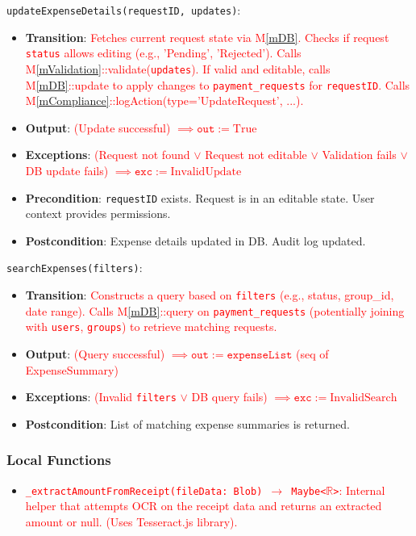 \documentclass[12pt, titlepage]{article}
\providecommand{\mref}[1]{M\ref{#1}}
\begin{document}
\noindent \texttt{updateExpenseDetails(requestID, updates)}:
\begin{itemize}
    \item \textbf{Transition}: \textcolor{red}{Fetches current request state via \mref{mDB}. Checks if request \texttt{status} allows editing (e.g., 'Pending', 'Rejected'). Calls \mref{mValidation}::validate(\texttt{updates}). If valid and editable, calls \mref{mDB}::update to apply changes to \texttt{payment\_requests} for \texttt{requestID}. Calls \mref{mCompliance}::logAction(type='UpdateRequest', ...).}
    \item \textbf{Output}: \textcolor{red}{(Update successful) $\implies \texttt{out} := \text{True}$}
    \item \textbf{Exceptions}: \textcolor{red}{(Request not found $\lor$ Request not editable $\lor$ Validation fails $\lor$ DB update fails) $\implies \texttt{exc} := \text{InvalidUpdate}$}
    \item \textbf{Precondition}: \texttt{requestID} exists. Request is in an editable state. User context provides permissions.
    \item \textbf{Postcondition}: Expense details updated in DB. Audit log updated.
\end{itemize}

\noindent \texttt{searchExpenses(filters)}:
\begin{itemize}
    \item \textbf{Transition}: \textcolor{red}{Constructs a query based on \texttt{filters} (e.g., status, group\_id, date range). Calls \mref{mDB}::query on \texttt{payment\_requests} (potentially joining with \texttt{users}, \texttt{groups}) to retrieve matching requests.}
    \item \textbf{Output}: \textcolor{red}{(Query successful) $\implies \texttt{out} := \texttt{expenseList}$ (seq of ExpenseSummary)}
    \item \textbf{Exceptions}: \textcolor{red}{(Invalid \texttt{filters} $\lor$ DB query fails) $\implies \texttt{exc} := \text{InvalidSearch}$}
    \item \textbf{Postcondition}: List of matching expense summaries is returned.
\end{itemize}

\subsubsection{Local Functions}
\begin{itemize}
    \item \textcolor{red}{\texttt{\_extractAmountFromReceipt(fileData: Blob) $\rightarrow$ Maybe<$\mathbb{R}$>}: Internal helper that attempts OCR on the receipt data and returns an extracted amount or null. (Uses Tesseract.js library).}
\end{itemize}
\end{document}
